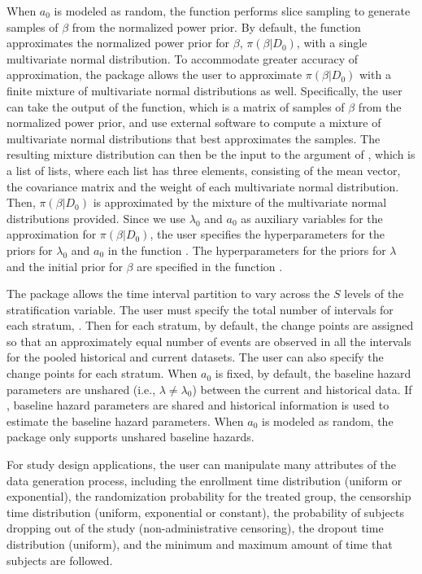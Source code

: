 When $a_0$ is modeled as random, the function  performs slice sampling to generate samples of $\beta$ from the normalized power prior. By default, the function  approximates the normalized power prior for $\beta$, $\pi(\beta|D_0)$, with a single multivariate normal distribution. To accommodate greater accuracy of approximation, the package allows the user to approximate $\pi(\beta|D_0)$ with a finite mixture of multivariate normal distributions as well. Specifically, the user can take the output of the  function, which is a matrix of samples of $\beta$ from the normalized power prior, and use external software to compute a mixture of multivariate normal distributions that best approximates the samples. The resulting mixture distribution can then be the input to the  argument of , which is a list of lists, where each list has three elements, consisting of the mean vector, the covariance matrix and the weight of each multivariate normal distribution. Then, $\pi(\beta|D_{0})$ is approximated by the mixture of the multivariate normal distributions provided. Since we use $\lambda_0$ and $a_0$ as auxiliary variables for the approximation for $\pi(\beta|D_0)$, the user specifies the hyperparameters for the priors for $\lambda_0$ and $a_0$ in the function . The hyperparameters for the priors for $\lambda$ and the initial prior for $\beta$ are specified in the function . 

The package allows the time interval partition to vary across the $S$ levels of the stratification variable. The user must specify the total number of intervals for each stratum, . Then for each stratum, by default, the change points are assigned so that an approximately equal number of events are observed in all the intervals for the pooled historical and current datasets. The user can also specify the change points for each stratum. When $a_0$ is fixed, by default, the baseline hazard parameters are unshared (i.e., $\lambda \neq \lambda_0$) between the current and historical data. If , baseline hazard parameters are shared and historical information is used to estimate the baseline hazard parameters. When $a_0$ is modeled as random, the package only supports unshared baseline hazards. 

For study design applications, the user can manipulate many attributes of the data generation process, including the enrollment time distribution (uniform or exponential), the randomization probability for the treated group, the censorship time distribution (uniform, exponential or constant), the probability of subjects dropping out of the study (non-administrative censoring), the dropout time distribution (uniform), and the minimum and maximum amount of time that subjects are followed.

